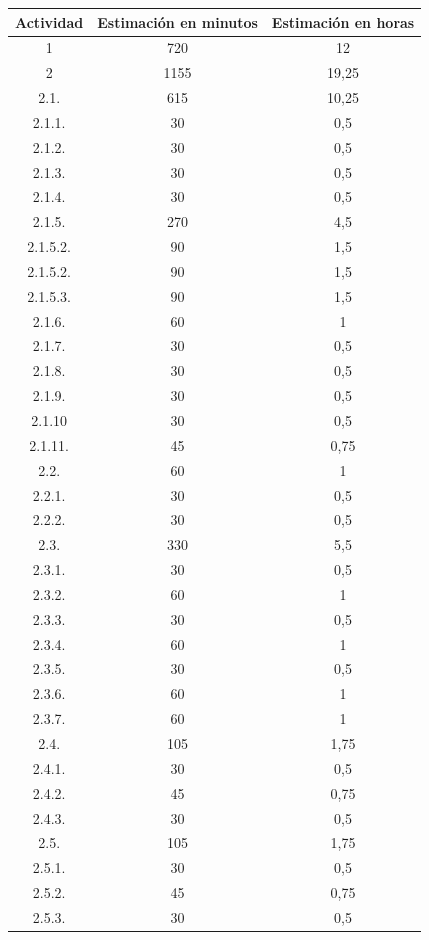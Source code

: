 \begin{longtable}{c|c|c}
\textbf{Actividad} & \textbf{Estimación en minutos} & \textbf{Estimación en horas} \\ \hline
1 & 720 & 12 \\ \hline
2 & 1155 & 19,25 \\ \hline
2.1. & 615 & 10,25 \\ \hline
2.1.1. & 30 & 0,5 \\ \hline
2.1.2. & 30 & 0,5 \\ \hline
2.1.3. & 30 & 0,5 \\ \hline
2.1.4. & 30 & 0,5 \\ \hline
2.1.5. & 270 & 4,5 \\ \hline
2.1.5.2. & 90 & 1,5 \\ \hline
2.1.5.2. & 90 & 1,5 \\ \hline
2.1.5.3. & 90 & 1,5 \\ \hline
2.1.6. & 60 & 1 \\ \hline
2.1.7. & 30 & 0,5 \\ \hline
2.1.8. & 30 & 0,5 \\ \hline
2.1.9. & 30 & 0,5 \\ \hline
2.1.10 & 30 & 0,5 \\ \hline
2.1.11. & 45 & 0,75 \\ \hline
2.2. & 60 & 1 \\ \hline
2.2.1. & 30 & 0,5 \\ \hline
2.2.2. & 30 & 0,5 \\ \hline
2.3. & 330 & 5,5 \\ \hline
2.3.1. & 30 & 0,5 \\ \hline
2.3.2. & 60 & 1 \\ \hline
2.3.3. & 30 & 0,5 \\ \hline
2.3.4. & 60 & 1 \\ \hline
2.3.5. & 30 & 0,5 \\ \hline
2.3.6. & 60 & 1 \\ \hline
2.3.7. & 60 & 1 \\ \hline
2.4. & 105 & 1,75 \\ \hline
2.4.1. & 30 & 0,5 \\ \hline
2.4.2. & 45 & 0,75 \\ \hline
2.4.3. & 30 & 0,5 \\ \hline
2.5. & 105 & 1,75 \\ \hline
2.5.1. & 30 & 0,5 \\ \hline
2.5.2. & 45 & 0,75 \\ \hline
2.5.3. & 30 & 0,5 \\ \hline

\end{longtable}
